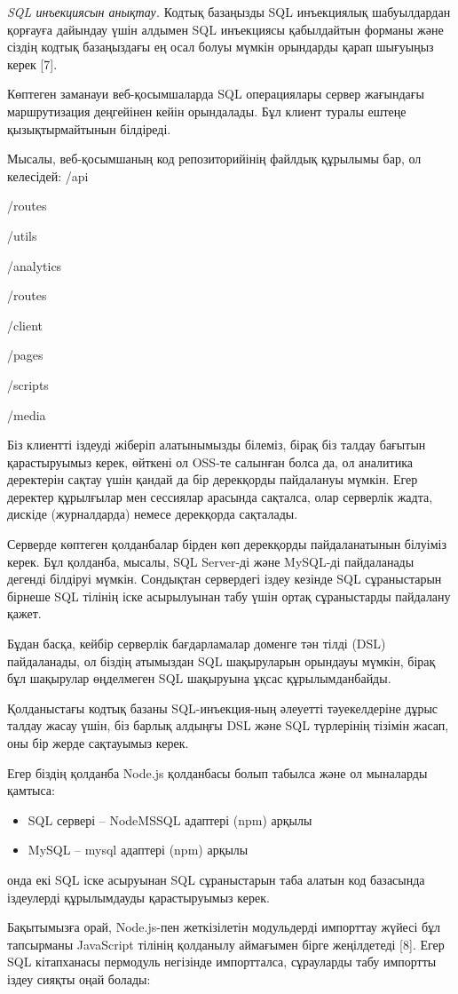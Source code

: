 \begin{multicols}{2}
\emph{SQL инъекциясын анықтау.} Кодтық базаңызды SQL инъекциялық
шабуылдардан қорғауға дайындау үшін алдымен SQL инъекциясы қабылдайтын
форманы және сіздің кодтық базаңыздағы ең осал болуы мүмкін орындарды
қарап шығуыңыз керек {[}7{]}.

Көптеген заманауи веб-қосымшаларда SQL операциялары сервер жағындағы
маршрутизация деңгейінен кейін орындалады. Бұл клиент туралы ештеңе
қызықтырмайтынын білдіреді.

Мысалы, веб-қосымшаның код репозиторийінің файлдық құрылымы бар, ол
келесідей:
/api

/routes

/utils

/analytics

/routes

/client

/pages

/scripts

/media

Біз клиентті іздеуді жіберіп алатынымызды білеміз, бірақ біз талдау
бағытын қарастыруымыз керек, өйткені ол OSS-те салынған болса да, ол
аналитика деректерін сақтау үшін қандай да бір дерекқорды пайдалануы
мүмкін. Егер деректер құрылғылар мен сессиялар арасында сақталса, олар
серверлік жадта, дискіде (журналдарда) немесе дерекқорда сақталады.

Серверде көптеген қолданбалар бірден көп дерекқорды пайдаланатынын
білуіміз керек. Бұл қолданба, мысалы, SQL Server-ді және MySQL-ді
пайдаланады дегенді білдіруі мүмкін. Сондықтан сервердегі іздеу кезінде
SQL сұраныстарын бірнеше SQL тілінің іске асырылуынан табу үшін ортақ
сұраныстарды пайдалану қажет.

Бұдан басқа, кейбір серверлік бағдарламалар доменге тән тілді (DSL)
пайдаланады, ол біздің атымыздан SQL шақыруларын орындауы мүмкін, бірақ
бұл шақырулар өңделмеген SQL шақыруына ұқсас құрылымданбайды.

Қолданыстағы кодтық базаны SQL-инъекция-ның әлеуетті тәуекелдеріне дұрыс
талдау жасау үшін, біз барлық алдыңғы DSL және SQL түрлерінің тізімін
жасап, оны бір жерде сақтауымыз керек.

Егер біздің қолданба Node.js қолданбасы болып табылса және ол мыналарды
қамтыса:

\begin{itemize}
  \setlength{\itemindent}{1cm} 
\item
  SQL сервері -- NodeMSSQL адаптері (npm) арқылы
\item
  MySQL -- mysql адаптері (npm) арқылы
\end{itemize}

онда екі SQL іске асыруынан SQL сұраныстарын таба алатын код базасында
іздеулерді құрылымдауды қарастыруымыз керек.

Бақытымызға орай, Node.js-пен жеткізілетін модульдерді импорттау жүйесі
бұл тапсырманы JavaScript тілінің қолданылу аймағымен бірге жеңілдетеді
{[}8{]}. Егер SQL кітапханасы пермодуль негізінде импортталса,
сұрауларды табу импортты іздеу сияқты оңай болады:
\end{multicols}

